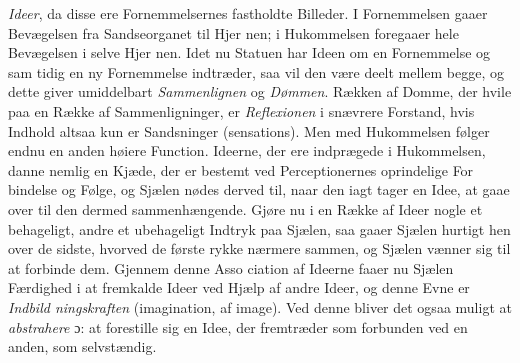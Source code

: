 \documentclass[12pt,a4paper]{book}
\begin{document}
\emph{Ideer}, da disse ere Fornemmelsernes fastholdte Billeder.
I Fornemmelsen gaaer Bevægelsen fra Sandseorganet til Hjer\-%
nen; i Hukommelsen foregaaer hele Bevægelsen i selve Hjer\-%
nen. Idet nu Statuen har Ideen om en Fornemmelse og sam\-%
tidig en ny Fornemmelse indtræder, saa vil den være deelt
mellem begge, og dette giver umiddelbart \emph{Sammenlignen}
og \emph{Dømmen}. Rækken af Domme, der hvile paa en Række
af Sammenligninger, er \emph{Reflexionen} i snævrere Forstand,
hvis Indhold altsaa kun er Sandsninger (sensations). Men
med Hukommelsen følger endnu en anden høiere Function.
Ideerne, der ere indprægede i Hukommelsen, danne nemlig en
Kjæde, der er bestemt ved Perceptionernes oprindelige For\-%
bindelse og Følge, og Sjælen nødes derved til, naar den iagt\-%
tager en Idee, at gaae over til den dermed sammenhængende.
Gjøre nu i en Række af Ideer nogle et behageligt, andre et
ubehageligt Indtryk paa Sjælen, saa gaaer Sjælen hurtigt hen
over de sidste, hvorved de første rykke nærmere sammen, og
Sjælen vænner sig til at forbinde dem. Gjennem denne Asso\-%
ciation af Ideerne faaer nu Sjælen Færdighed i at fremkalde
Ideer ved Hjælp af andre Ideer, og denne Evne er \emph{Indbild\-%
ningskraften} (imagination, af image). Ved denne bliver det
ogsaa muligt at \emph{abstrahere} ɔ: at forestille sig en Idee, der
fremtræder som forbunden ved en anden, som selvstændig.
\end{document}
